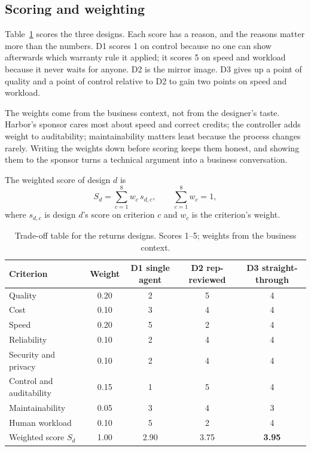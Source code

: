 \subsection{Scoring and weighting}

Table~\ref{tab:tradeoff} scores the three designs. Each score has a reason, and the reasons matter more than the numbers. D1 scores 1 on control because no one can show afterwards which warranty rule it applied; it scores 5 on speed and workload because it never waits for anyone. D2 is the mirror image. D3 gives up a point of quality and a point of control relative to D2 to gain two points on speed and workload.

The weights come from the business context, not from the designer's taste. Harbor's sponsor cares most about speed and correct credits; the controller adds weight to auditability; maintainability matters least because the process changes rarely. Writing the weights down before scoring keeps them honest, and showing them to the sponsor turns a technical argument into a business conversation.

The weighted score of design $d$ is
\begin{equation}
  S_d = \sum_{c=1}^{8} w_c \, s_{d,c}, \qquad \sum_{c=1}^{8} w_c = 1,
  \label{eq:weighted}
\end{equation}
where $s_{d,c}$ is design $d$'s score on criterion $c$ and $w_c$ is the criterion's weight.

\begin{table}[htbp]
\centering
\small
\caption{Trade-off table for the returns designs. Scores 1--5; weights from the business context.}
\label{tab:tradeoff}
\begin{tabular}{@{}lcccc@{}}
\toprule
Criterion & Weight & D1 single agent & D2 rep-reviewed & D3 straight-through \\
\midrule
Quality & 0.20 & 2 & 5 & 4 \\
Cost & 0.10 & 3 & 4 & 4 \\
Speed & 0.20 & 5 & 2 & 4 \\
Reliability & 0.10 & 2 & 4 & 4 \\
Security and privacy & 0.10 & 2 & 4 & 4 \\
Control and auditability & 0.15 & 1 & 5 & 4 \\
Maintainability & 0.05 & 3 & 4 & 3 \\
Human workload & 0.10 & 5 & 2 & 4 \\
\midrule
Weighted score $S_d$ & 1.00 & 2.90 & 3.75 & \textbf{3.95} \\
\bottomrule
\end{tabular}
\end{table}

